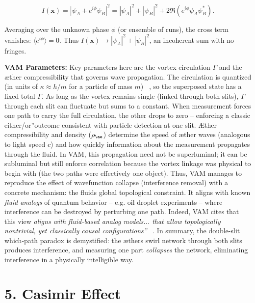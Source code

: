 \documentclass[a4paper, aps,preprint,superscriptaddress, 12pt]{revtex4}
\begin{document}
\begin{equation}
    I(\mathbf{x}) = |\psi_A + e^{i\phi}\psi_B|^2 = |\psi_A|^2 + |\psi_B|^2 + 2\Re(e^{i\phi}\psi_A \psi_B^*).
\end{equation}

Averaging over the unknown phase $\phi$ (or ensemble of runs), the cross term vanishes: $\langle e^{i\phi}\rangle = 0$. Thus $I(\mathbf{x}) \to |\psi_A|^2 + |\psi_B|^2$, an incoherent sum with no fringes.


\textbf{VAM Parameters:} Key parameters here are the vortex circulation $\Gamma$ and the æther compressibility that governs wave propagation. The circulation is quantized (in units of $\kappa \approx h/m$ for a particle of mass $m$)~\cite{Iskandarani2025c} , so the superposed state has a fixed total $\Gamma$. As long as the vortex remains single (linked through both slits), $\Gamma$ through each slit can fluctuate but sums to a constant. When measurement forces one path to carry the full circulation, the other drops to zero – enforcing a classic \grqq either/or\textquotedblright outcome consistent with particle detection at one slit. Æther compressibility and density ($\rho_{\ae}$) determine the speed of æther waves (analogous to light speed $c$) and how quickly information about the measurement propagates through the fluid. In VAM, this propagation need not be superluminal; it can be subluminal but still enforce correlation because the vortex linkage was physical to begin with (the two paths were effectively one object). Thus, VAM manages to reproduce the effect of wavefunction collapse (interference removal) with a concrete mechanism: the fluid\rqs s global topological constraint. It aligns with known \textit{fluid analogs} of quantum behavior – e.g. oil droplet experiments – where interference can be destroyed by perturbing one path. Indeed, VAM cites that this view \textit{\grqq aligns with fluid-based analog models... that allow topologically nontrivial, yet classically causal configurations\textquotedblright}~\cite{Iskandarani2025c} . In summary, the double-slit which-path paradox is demystified: the æther\rqs s swirl network through both slits produces interference, and measuring one part \textit{collapses} the network, eliminating interference in a physically intelligible way.


\section*{5. Casimir Effect}
\end{document}
